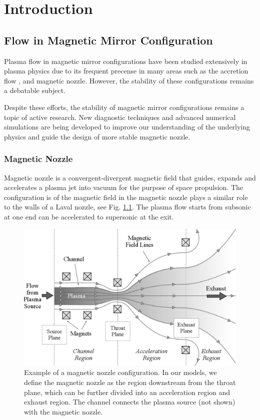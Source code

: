 \chapter{Introduction}

\section{Flow in Magnetic Mirror Configuration}
Plasma flow in magnetic mirror configurations have been studied extensively in plasma physics due to its frequent precense in many areas such as the accretion flow\cite{jockers_stability_1968,aikawa_stability_1979} , and magnetic nozzle\cite{smolyakov_quasineutral_2021}. However, the stability of these configurations remains a debatable subject.



Despite these efforts, the stability of magnetic mirror configurations remains a topic of active research. New diagnostic techniques and advanced numerical simulations are being developed to improve our understanding of the underlying physics and guide the design of more stable magnetic nozzle.

\subsection{Magnetic Nozzle}
Magnetic nozzle is a convergent-divergent magnetic field that guides, expands and accelerates a plasma jet into vacuum for the purpose of space propulsion. \cite{andersen_continuous_1969,boswell_experimental_2004,williams_fusion_2003} The configuration is of the magnetic field in the magnetic nozzle plays a similar role to the walls of a Laval nozzle, see Fig. \ref{fig:magnetic-nozzle}. The plasma flow starts from subsonic at one end can be accelerated to supersonic at the exit. 

\begin{figure}[h]
	\centering
	\includegraphics[width=0.7\linewidth]{img/introduction/magnetic_nozzle}
	\caption{Example of a magnetic nozzle configuration. In our models, we define the magnetic nozzle as the region downstream from the throat plane, which can be further divided into an acceleration region and exhaust region. The channel connects the plasma source (not shown) with the magnetic nozzle. \cite{little_performance_2015}}
	\label{fig:magnetic-nozzle}
\end{figure}


